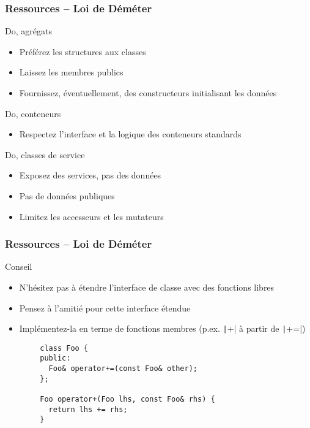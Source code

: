 \documentclass[C++.tex]{subfiles}
\begin{document}
\begin{frame}[fragile]
	\frametitle{Ressources -- Loi de Déméter}
	\begin{exampleblock}{Do, agrégats}
		\begin{itemize}
			\item Préférez les structures aux classes
			\item Laissez les membres publics
			\item Fournissez, éventuellement, des constructeurs initialisant les données
		\end{itemize}
	\end{exampleblock}

	\begin{exampleblock}{Do, conteneurs}
		\begin{itemize}
			\item Respectez l'interface et la logique des conteneurs standards
		\end{itemize}
	\end{exampleblock}

	\begin{exampleblock}{Do, classes de service}
		\begin{itemize}
			\item Exposez des services, pas des données
			\item Pas de données publiques
			\item Limitez les accesseurs et les mutateurs
		\end{itemize}
	\end{exampleblock}
\end{frame}

\begin{frame}[fragile]
	\frametitle{Ressources -- Loi de Déméter}
	\begin{block}{Conseil}
		\begin{itemize}
			\item N'hésitez pas à étendre l'interface de classe avec des fonctions libres
			\item Pensez à l'amitié pour cette interface étendue
			\item Implémentez-la en terme de fonctions membres (p.ex. \texttt|+| à partir de \texttt|+=|)
		\end{itemize}
	\end{block}

	\begin{verbatim}
		class Foo {
		public:
		  Foo& operator+=(const Foo& other);
		};

		Foo operator+(Foo lhs, const Foo& rhs) {
		  return lhs += rhs;
		}
	\end{verbatim}
\end{frame}
\end{document}
